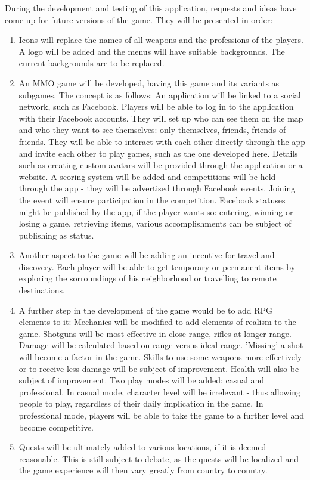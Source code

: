 \documentclass{article}
\begin{document}
During the development and testing of this application, requests and ideas have
come up for future versions of the game. They will be presented in
order:\newline
\begin{enumerate}
  \item Icons will replace the names of all weapons and the professions of the
  players. A logo will be added and the menus will have suitable backgrounds.
  The current backgrounds are to be replaced.
  
  \item An MMO game will be developed, having this game and its variants as
  subgames. The concept is as follows: An application will be linked to a social
  network, such as Facebook. Players will be able to log in to the application
  with their Facebook accounts. They will set up who can see them on the map and
  who they want to see themselves: only themselves, friends, friends of friends.
  They will be able to interact with each other directly through the app and
  invite each other to play games, such as the one developed here. Details such
  as creating custom avatars will be provided through the application or a
  website. A scoring system will be added and competitions will be held through
  the app - they will be advertised through Facebook events. Joining the event
  will ensure participation in the competition. Facebook statuses might be
  published by the app, if the player wants so: entering, winning or losing a
  game, retrieving items, various accomplishments can be subject of publishing
  as status.
  
  \item Another aspect to the game will be adding an incentive for travel and
  discovery. Each player will be able to get temporary or permanent items by
  exploring the sorroundings of his neighborhood or travelling to remote
  destinations. 
  
  \item A further step in the development of the game would be to add RPG
  elements to it: Mechanics will be modified to add elements of realism to the
  game. Shotguns will be most effective in close range, rifles at longer range.
  Damage will be calculated based on range versus ideal range. 'Missing' a shot
  will become a factor in the game. Skills to use some weapons more effectively
  or to receive less damage will be subject of improvement. Health will also be
  subject of improvement. Two play modes will be added: casual and professional.
  In casual mode, character level will be irrelevant - thus allowing people to
  play, regardless of their daily implication in the game. In professional mode,
  players will be able to take the game to a further level and become
  competitive. 
  
  \item Quests will be ultimately added to various locations, if it is deemed
  reasonable. This is still subject to debate, as the quests will be localized
  and the game experience will then vary greatly from country to country.  
  
\end{enumerate}
\end{document}
